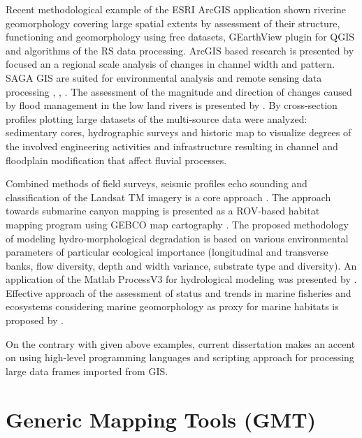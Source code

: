 \documentclass[11pt,a4paper]{report}
\begin{document}
{Recent methodological example of the \ac{ESRI} ArcGIS application \cite{Bechteretal2018} shown riverine geomorphology covering large spatial extents by assessment of their structure, functioning and geomorphology using free datasets, GEarthView plugin for \ac{QGIS} and algorithms of the \ac{RS} data processing. ArcGIS based research is presented by \cite{Marcheseetal2017} focused an a regional scale analysis of changes in channel width and pattern. SAGA GIS are suited for environmental analysis and remote sensing data processing \cite{Lemenkova202014}, \cite{Lemenkova202021}, \cite{Lemenkova202024}. The assessment of the magnitude and direction of changes caused by flood management in the low land rivers is presented by \cite{Hudsonetal2008}. By cross-section profiles plotting large datasets of the multi-source data were analyzed: sedimentary cores, hydrographic surveys and historic map to visualize degrees of the involved engineering activities and infrastructure resulting in channel and floodplain modification that affect fluvial processes. 

Combined methods of field surveys, seismic profiles echo sounding and classification of the Landsat TM imagery is a core approach \cite{Iannirubertoeta2018}. The approach towards submarine canyon mapping is presented as a \ac{ROV}-based habitat mapping program using \ac{GEBCO} map cartography \cite{Huvenneetal2011}. The proposed methodology of modeling hydro-morphological degradation \cite{Klaueretal2014} is based on various environmental parameters of particular ecological importance (longitudinal and transverse banks, flow diversity, depth and width variance, substrate type and diversity). An application of the Matlab ProcessV3 for hydrological modeling was presented by \cite{Leetal2018}. Effective approach of the assessment of status and trends in marine fisheries and ecosystems considering marine geomorphology as proxy for marine habitats is proposed by \cite{HeymanWright2011}. 

On the contrary with given above examples, current dissertation makes an accent on using high-level programming languages and scripting approach for processing large data frames imported from \ac{GIS}. 

\pagebreak
\section{Generic Mapping Tools (GMT)}\label{sec:GMT}

}
\end{document}
